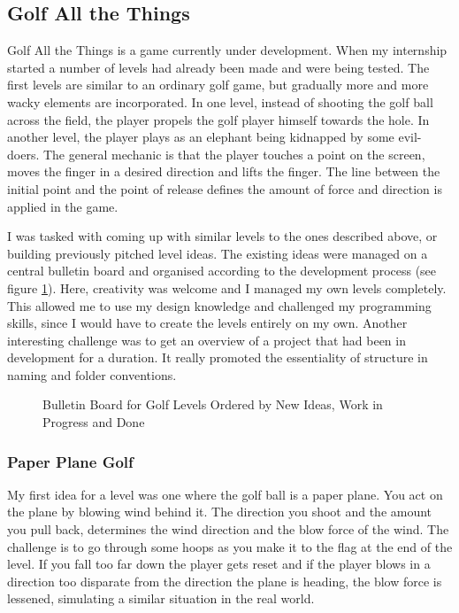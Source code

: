 \subsection{Golf All the Things}
Golf All the Things is a game currently under development. When my internship started a number of levels had already been made and were being tested. The first levels are similar to an ordinary golf game, but gradually more and more wacky elements are incorporated. In one level, instead of shooting the golf ball across the field, the player propels the golf player himself towards the hole. In another level, the player plays as an elephant being kidnapped by some evil-doers. The general mechanic is that the player touches a point on the screen, moves the finger in a desired direction and lifts the finger. The line between the initial point and the point of release defines the amount of force and direction is applied in the game.

I was tasked with coming up with similar levels to the ones described above, or building previously pitched level ideas. The existing ideas were managed on a central bulletin board and organised according to the development process (see figure \ref{Bulletin}). Here, creativity was welcome and I managed my own levels completely. This allowed me to use my design knowledge and challenged my programming skills, since I would have to create the levels entirely on my own. Another interesting challenge was to get an overview of a project that had been in development for a duration. It really promoted the essentiality of structure in naming and folder conventions.
\begin{center}
  \begin{figure}[!htb]
    \noindent{}
    \caption{Bulletin Board for Golf Levels Ordered by New Ideas, Work in Progress and Done}
    \label{Bulletin}
  \end{figure}
\end{center}
\subsubsection{Paper Plane Golf}
My first idea for a level was one where the golf ball is a paper plane. You act on the plane by blowing wind behind it. The direction you shoot and the amount you pull back, determines the wind direction and the blow force of the wind. The challenge is to go through some hoops as you make it to the flag at the end of the level. If you fall too far down the player gets reset and if the player blows in a direction too disparate from the direction the plane is heading, the blow force is lessened, simulating a similar situation in the real world.

